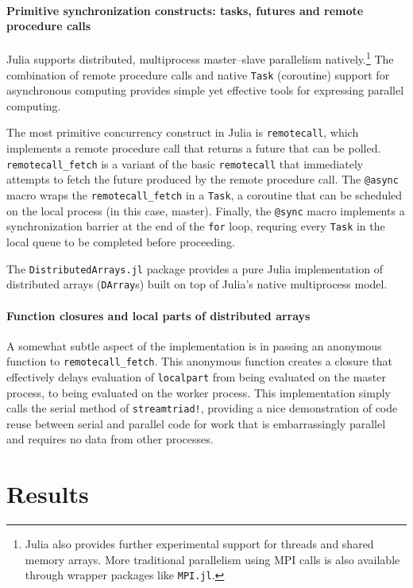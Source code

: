 \documentclass{article}
\begin{document}
\paragraph{Primitive synchronization constructs: tasks, futures and remote
procedure calls}
Julia supports distributed, multiprocess master--slave parallelism
natively.\footnote{Julia also provides further experimental support for threads
and shared memory arrays. More traditional parallelism using MPI calls is also
available through wrapper packages like \lstinline|MPI.jl|.}
The combination of remote procedure calls and native \lstinline|Task|
(coroutine) support for asynchronous computing provides simple yet effective
tools for expressing parallel computing.

The most primitive concurrency construct in Julia is \lstinline|remotecall|,
which implements a remote procedure call that returns a future that can be
polled. \lstinline|remotecall_fetch| is a variant of the basic
\lstinline|remotecall| that immediately attempts to fetch the future produced
by the remote procedure call. The \lstinline|@async| macro wraps the
\lstinline|remotecall_fetch| in a \lstinline|Task|, a coroutine that can be
scheduled on the local process (in this case, master). Finally, the
\lstinline|@sync| macro implements a synchronization barrier at the end of the
\lstinline|for| loop, requring every \lstinline|Task| in the local queue to be
completed before proceeding.

The \lstinline|DistributedArrays.jl| package provides a pure Julia
implementation of distributed arrays (\lstinline|DArray|s) built on top of
Julia's native multiprocess model.

\paragraph{Function closures and local parts of distributed arrays}
A somewhat subtle aspect of the implementation is in passing an anonymous
function to \lstinline|remotecall_fetch|. This anonymous function creates a
closure that effectively delays evaluation of \lstinline|localpart| from being
evaluated on the master process, to being evaluated on the worker process.
This implementation simply calls the serial method of \lstinline|streamtriad!|,
providing a nice demonstration of code reuse between serial and parallel code
for work that is embarrassingly parallel and requires no data from other
processes.

\section{Results}
\end{document}
